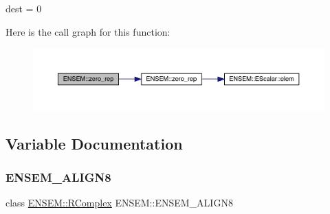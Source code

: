 dest = 0 

Here is the call graph for this function\+:\nopagebreak
\begin{figure}[H]
\begin{center}
\leavevmode
\includegraphics[width=350pt]{da/dc7/group__rcomplex_gaf64745e6e9f179738a187230acf6b2ea_cgraph}
\end{center}
\end{figure}


\subsection{Variable Documentation}
\mbox{\label{group__rcomplex_ga253974755fe5c9f74b16a943e4e26ff5}} 
\subsubsection{\texorpdfstring{ENSEM\_ALIGN8}{ENSEM\_ALIGN8}}
{\footnotesize\ttfamily class \mbox{\hyperlink{classENSEM_1_1RComplex}{E\+N\+S\+E\+M\+::\+R\+Complex}} E\+N\+S\+E\+M\+::\+E\+N\+S\+E\+M\+\_\+\+A\+L\+I\+G\+N8}

